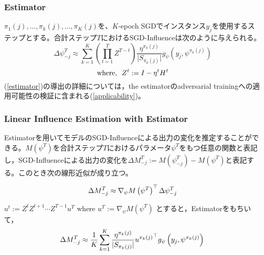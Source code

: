 \documentclass{article}
\begin{document}
        \subsubsection{Estimator}
            \(\pi _{1} \left( j \right) ,  \ldots , \pi _{k} \left( j \right) , \ldots , \pi _{K} \left( j \right)\)を、\(K\)-epoch SGDでインスタンス\(y_j\)を使用するステップとする。合計ステップ\(T\)におけるSGD-Influenceは次のように与えられる。
         \begin{equation}
            \label{estimator}
            \Delta  \psi _{-j}^{T}\approx \sum _{k=1}^{K} \left(  \prod_{t=1}^{T}Z^{T-t} \right) \frac{\eta^{ \pi _{k} \left( j \right) }}{ \vert S_{ \pi _{k} \left( j \right) } \vert }g_\psi \left( y_{j}, \psi _{}^{ \pi _{k} \left( j \right) } \right)
        \end{equation}
        \begin{equation*}
            \mathrm{where,~~} Z^{t}:=I-\eta^{t}H^{t}  \notag
        \end{equation*}
        (\ref{estimator})の導出の詳細については，the estimatorのadversarial trainingへの適用可能性の検証に含まれる(\ref{applicability})。
            
        \subsubsection{Linear Influence Estimation with Estimator}
            Estimatorを用いてモデルのSGD-Influenceによる出力の変化を推定することができる。\(M\left(\psi^T\right)\)を合計ステップ\(T\)におけるパラメータ\(\psi^T\)をもつ任意の関数と表記し，SGD-Influenceによる出力の変化を\(\Delta M_{-j}^T := M \left(\psi _{-j}^{T} \right) -M \left( \psi ^{T} \right)\)と表記する。このとき次の線形近似が成り立つ。

            \begin{equation}
                \Delta M_{-j}^T \approx \nabla_\psi M \left( \psi ^{T} \right) ^\top \Delta \psi _{-j}^{T} \\
            \end{equation}
            
            \(u^{t}:=Z^{t}Z^{t+1} \cdots Z^{T-1} u^T \) where  \(u^T :=  \nabla_\psi M \left( \psi ^{T} \right) \) とすると，Estimatorをもちいて，
            \begin{equation}
                \label{lie}
                \Delta M_{-j}^T \approx \frac{1}{K} \sum _{k=1}^{K}\frac{\eta^{ \pi _{k} \left( j \right) }}{ \vert S_{\pi _{k} \left( j \right)}  \vert }{u^{ \pi _{k} \left( j \right) }}^\top g_\psi \left( y_{j}, \psi ^{ \pi _{k} \left( j \right) } \right)  \\
            \end{equation}




\end{document}

